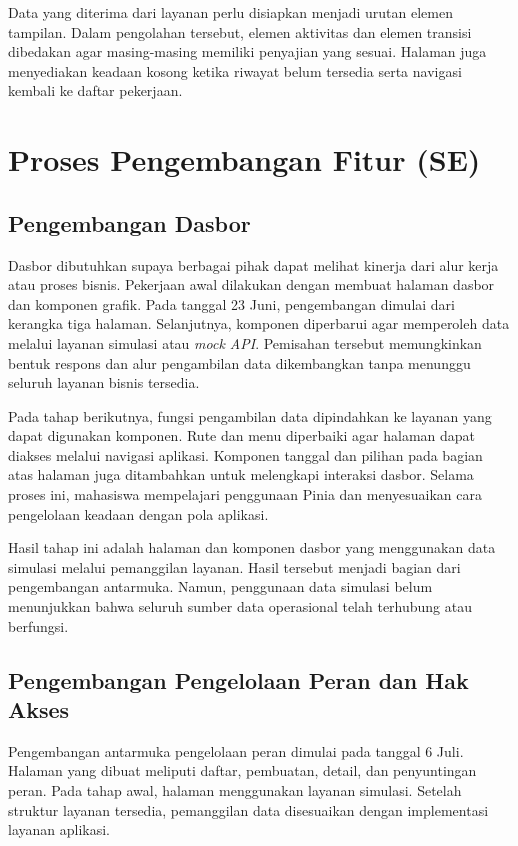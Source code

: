 Data yang diterima dari layanan perlu disiapkan menjadi urutan elemen tampilan. Dalam pengolahan tersebut, elemen aktivitas dan elemen transisi dibedakan agar masing-masing memiliki penyajian yang sesuai. Halaman juga menyediakan keadaan kosong ketika riwayat belum tersedia serta navigasi kembali ke daftar pekerjaan.

\section{Proses Pengembangan Fitur (SE)}
\subsection{Pengembangan Dasbor}\label{sec:dasbor}
Dasbor dibutuhkan supaya berbagai pihak dapat melihat kinerja dari alur kerja atau proses bisnis. Pekerjaan awal dilakukan dengan membuat halaman dasbor dan komponen grafik. Pada tanggal 23 Juni, pengembangan dimulai dari kerangka tiga halaman. Selanjutnya, komponen diperbarui agar memperoleh data melalui layanan simulasi atau \textit{mock API}. Pemisahan tersebut memungkinkan bentuk respons dan alur pengambilan data dikembangkan tanpa menunggu seluruh layanan bisnis tersedia.

Pada tahap berikutnya, fungsi pengambilan data dipindahkan ke layanan yang dapat digunakan komponen. Rute dan menu diperbaiki agar halaman dapat diakses melalui navigasi aplikasi. Komponen tanggal dan pilihan pada bagian atas halaman juga ditambahkan untuk melengkapi interaksi dasbor. Selama proses ini, mahasiswa mempelajari penggunaan Pinia dan menyesuaikan cara pengelolaan keadaan dengan pola aplikasi.

Hasil tahap ini adalah halaman dan komponen dasbor yang menggunakan data simulasi melalui pemanggilan layanan. Hasil tersebut menjadi bagian dari pengembangan antarmuka. Namun, penggunaan data simulasi belum menunjukkan bahwa seluruh sumber data operasional telah terhubung atau berfungsi.

\subsection{Pengembangan Pengelolaan Peran dan Hak Akses}
Pengembangan antarmuka pengelolaan peran dimulai pada tanggal 6 Juli. Halaman yang dibuat meliputi daftar, pembuatan, detail, dan penyuntingan peran. Pada tahap awal, halaman menggunakan layanan simulasi. Setelah struktur layanan tersedia, pemanggilan data disesuaikan dengan implementasi layanan aplikasi.

